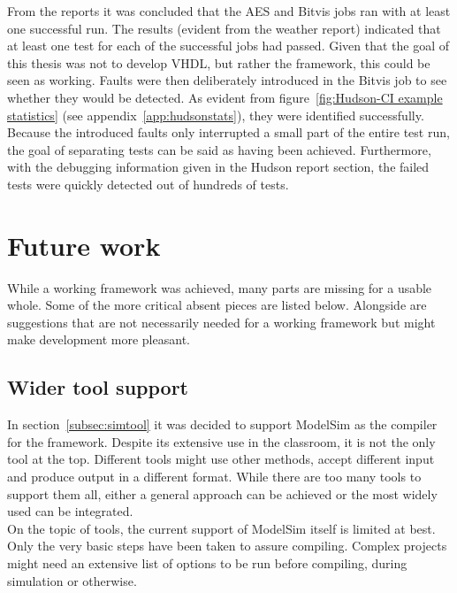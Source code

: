 \documentclass[11pt,british]{article}
\begin{document}
From the reports it was concluded that the AES and Bitvis jobs ran with at least one successful run. The results (evident from the weather report) indicated that at least one test for each of the successful jobs had passed. Given that the goal of this thesis was not to develop \gls{VHDL}, but rather the framework, this could be seen as working. Faults were then deliberately introduced in the Bitvis job to see whether they would be detected. As evident from figure~\ref{fig:Hudson-CI example statistics} (see appendix~\ref{app:hudsonstats}), they were identified successfully.
\\[\baselineskip]
Because the introduced faults only interrupted a small part of the entire test run, the goal of separating tests can be said as having been achieved. Furthermore, with the debugging information given in the Hudson report section, the failed tests were quickly detected out of hundreds of tests.



\newpage{}
\section{Future work}
While a working framework was achieved, many parts are missing for a usable whole. Some of the more critical absent pieces are listed below. Alongside are suggestions that are not necessarily needed for a working framework but might make development more pleasant.

\subsection{Wider tool support}
In section~\ref{subsec:simtool} it was decided to support ModelSim as the compiler for the framework. Despite its extensive use in the classroom, it is not the only tool at the top. Different tools might use other methods, accept different input and produce output in a different format. While there are too many tools to support them all, either a general approach can be achieved or the most widely used can be integrated.
\\[\baselineskip]
On the topic of tools, the current support of ModelSim itself is limited at best. Only the very basic steps have been taken to assure compiling. Complex projects might need an extensive list of options to be run before compiling, during simulation or otherwise.
\end{document}
